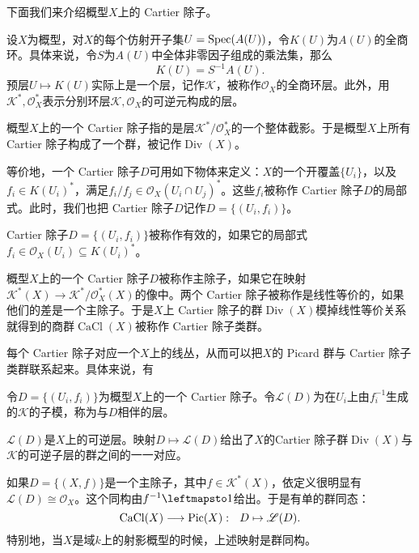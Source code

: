 下面我们来介绍概型$X$上的 Cartier 除子。

\begin{definition}
设$X$为概型，对$X$的每个仿射开子集$U = \operatorname{Spec}(A(U))$，令$K(U)$为$A(U)$的全商环。具体来说，令$S$为$A(U)$中全体非零因子组成的乘法集，那么
\begin{equation}
K(U) = S^{-1}A(U).
\end{equation}
预层$U\mapsto K(U)$实际上是一个层，记作$\mathscr{K}$，被称作$\mathcal{O}_X$的全商环层。此外，用$\mathscr{K}^*, \mathcal{O}_X^*$表示分别环层$\mathscr{K}, \mathcal{O}_X$的可逆元构成的层。
\end{definition}

\begin{definition}
概型$X$上的一个 Cartier 除子指的是层$\mathscr{K}^* / \mathcal{O}_X^*$的一个整体截影。于是概型$X$上所有 Cartier 除子构成了一个群，被记作$\operatorname{Div}(X)$。
\end{definition}
等价地，一个 Cartier 除子$D$可用如下物体来定义：$X$的一个开覆盖$\{U_i\}$，以及$f_i\in K(U_i)^*$，满足$f_i / f_j \in \mathcal{O}_X(U_i\cap U_j)^*$。这些$f_i$被称作 Cartier 除子$D$的局部式。此时，我们也把 Cartier 除子$D$记作$D = \{(U_i, f_i)\}$。

\begin{definition}
Cartier 除子$D = \{(U_i, f_i)\}$被称作有效的，如果它的局部式$f_i\in \mathcal{O}_X(U_i) \subseteq K(U_i)^*$。
\end{definition}

\begin{definition}
概型$X$上的一个 Cartier 除子$D$被称作主除子，如果它在映射$\mathscr{K}^*(X) \to \mathscr{K}^* / \mathcal{O}_X^*(X)$的像中。两个 Cartier 除子被称作是线性等价的，如果他们的差是一个主除子。于是$X$上 Cartier 除子的群$\operatorname{Div}(X)$模掉线性等价关系就得到的商群$\operatorname{CaCl}(X)$被称作 Cartier 除子类群。
\end{definition}

每个 Cartier 除子对应一个$X$上的线丛，从而可以把$X$的 Picard 群与 Cartier 除子类群联系起来。具体来说，有

\begin{definition}
令$D = \{(U_i, f_i)\}$为概型$X$上的一个 Cartier 除子。令$\mathscr{L}(D)$为在$U_i$上由$f_i^{-1}$生成的$\mathscr{K}$的子模，称为与$D$相伴的层。
\end{definition}

\begin{proposition}
$\mathscr{L}(D)$是$X$上的可逆层。映射$D\mapsto \mathscr{L}(D)$给出了$X$的Cartier 除子群$\operatorname{Div}(X)$与$\mathscr{K}$的可逆子层的群之间的一一对应。
\end{proposition}
如果$D = \{(X, f)\}$是一个主除子，其中$f\in \mathscr{K}^*(X)$，依定义很明显有$\mathscr{L}(D)\cong \mathcal{O}_X$。这个同构由$f^{-1} \leftmapsto 1$给出。于是有单的群同态：
\begin{equation}
\operatorname{CaCl}(X) \longrightarrow \operatorname{Pic}(X): ~~ D \mapsto \mathscr{L}(D).
\end{equation}
特别地，当$X$是域$k$上的射影概型的时候，上述映射是群同构。



